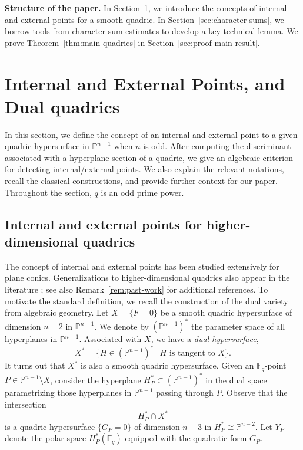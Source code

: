 \documentclass[12pt,reqno]{amsart}
\theoremstyle{definition}
\newcommand{\F}{\mathbb{F}}
\begin{document}
\textbf{Structure of the paper.} In Section~\ref{sec:internal-external}, we introduce the concepts of internal and external points for a smooth quadric. In Section~\ref{sec:character-sums}, we borrow tools from character sum estimates to develop a key technical lemma. We prove Theorem~\ref{thm:main-quadrics} in Section~\ref{sec:proof-main-result}.

\section{Internal and External Points, and Dual quadrics}\label{sec:internal-external}

In this section, we define the concept of an internal and external point to a given quadric hypersurface in $\mathbb{P}^{n-1}$ when $n$ is odd. After computing the discriminant associated with a hyperplane section of a quadric, we give an algebraic criterion for detecting internal/external points. We also explain the relevant notations, recall the classical constructions, and provide further context for our paper. Throughout the section, $q$ is an odd prime power.

\subsection{Internal and external points for higher-dimensional quadrics}\label{subsect:internal-external-higher}

The concept of internal and external points has been studied extensively for plane conics. Generalizations to higher-dimensional quadrics also appear in the literature \cite[Section 1.9]{HT16}; see also Remark~\ref{rem:past-work} for additional references. To motivate the standard definition, we recall the construction of the dual variety from algebraic geometry. Let $X = \{F=0\}$ be a smooth quadric hypersurface of dimension $n-2$ in $\mathbb{P}^{n-1}$. We denote by $(\mathbb{P}^{n-1})^{\ast}$ the parameter space of all hyperplanes in $\mathbb{P}^{n-1}$. Associated with $X$, we have a \emph{dual hypersurface},
$$
X^{\ast} = \{H \in (\mathbb{P}^{n-1})^{\ast} \ | \ H \text{ is tangent to } X \}.
$$
It turns out that $X^{\ast}$ is also a smooth quadric hypersurface. Given an $\F_q$-point $P\in \mathbb{P}^{n-1} \setminus X$, consider the hyperplane $H^{\ast}_{P}\subset (\mathbb{P}^{n-1})^{\ast}$ in the dual space parametrizing those hyperplanes in $\mathbb{P}^{n-1}$ passing through $P$. Observe that the intersection 
$$
H^{\ast}_{P} \cap X^{\ast} 
$$
is a quadric hypersurface $\{G_P = 0\}$ of dimension $n-3$ in $H^{\ast}_{P}\cong \mathbb{P}^{n-2}$. Let $Y_P$ denote the polar space $H^{\ast}_{P}(\F_q)$ equipped with the quadratic form $G_P$. 
\end{document}
